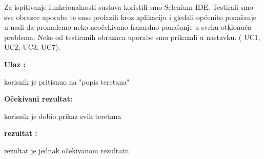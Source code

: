 		
		 	 Za ispitivanje funkcionalnosti sustava koristili smo Selenium IDE. Testirali smo
		 	 sve obrazce uporabe te smo prolazili kroz aplikaciju i gledali općenito ponašanje
		 	 u nadi da pronađemo neko neočekivano hazardno ponašanje u svrhu otklonuća problema.
		 	 Neke od testiranih obrazaca uporabe smo prikazali u nastavku. ( UC1, UC2, UC3, UC7).
		 	 
		 	 
	
	            \noindent {}
                \begin{packed_item}
						\item  \textbf{Ulaz : } 
						\item[] \begin{packed_enum}
	
							\item korisnik je pritisnuo na "popis teretana"

						\end{packed_enum}
						\item  \textbf{Očekivani rezultat: } 
						\item[] \begin{packed_enum}
	
							\item korisnik je dobio prikaz svih teretana

						\end{packed_enum}
						
						\item  \textbf{rezultat : }
						\item[] \begin{packed_enum}
	
							\item rezultat je jednak očekivanom rezultatu.

						\end{packed_enum}

				\end{packed_item}
				
